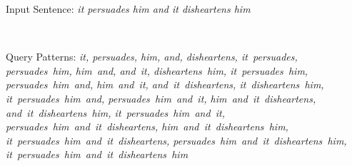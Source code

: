 Input Sentence:
{\em it persuades him and it disheartens him}

~

Query Patterns:
{\em
it, persuades, him, and, disheartens,
it~persuades, persuades~him, him~and, and~it, disheartens~him,
it~persuades~him, persuades~him~and, him~and~it, and~it~disheartens, it~disheartens~him,
it~persuades~him~and, persuades~him~and~it, him~and~it~disheartens, and~it~disheartens~him,
it~persuades~him~and~it, persuades~him~and~it~disheartens, him~and~it~disheartens~him,
it~persuades~him~and~it~disheartens, persuades~him~and~it~disheartens~him,
it~persuades~him~and~it~disheartens~him
}
